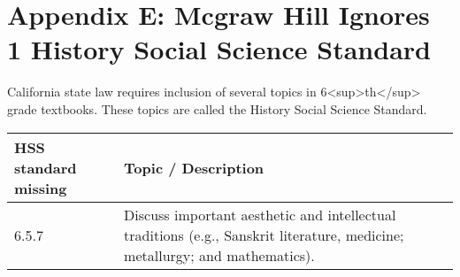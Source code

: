 \chapter{Appendix E: Mcgraw Hill Ignores 1 History Social Science Standard}

California state law requires inclusion of several topics in 6<sup>th</sup> grade textbooks. These topics are called the History Social Science Standard.

\begin{tabular}{|l|l|}
\hline
HSS standard missing & Topic / Description\\
\hline 
6.5.7 & Discuss important aesthetic and intellectual traditions (e.g., Sanskrit literature, medicine; metallurgy; and mathematics).\\
\hline
\end{tabular}
